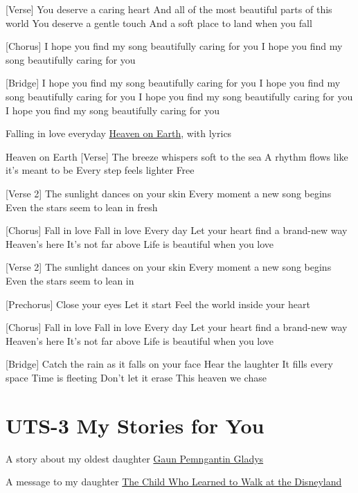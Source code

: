 \documentclass[
  letterpaper,
  DIV=11,
  numbers=noendperiod]{scrreprt}
\begin{document}
{[}Verse{]} You deserve a caring heart And all of the most beautiful
parts of this world You deserve a gentle touch And a soft place to land
when you fall

{[}Chorus{]} I hope you find my song beautifully caring for you I hope
you find my song beautifully caring for you

{[}Bridge{]} I hope you find my song beautifully caring for you I hope
you find my song beautifully caring for you I hope you find my song
beautifully caring for you I hope you find my song beautifully caring
for you

Falling in love everyday \href{./Heaven\%20on\%20Earth.mp3}{Heaven on
Earth}, with lyrics

Heaven on Earth {[}Verse{]} The breeze whispers soft to the sea A rhythm
flows like it's meant to be Every step feels lighter Free

{[}Verse 2{]} The sunlight dances on your skin Every moment a new song
begins Even the stars seem to lean in fresh

{[}Chorus{]} Fall in love Fall in love Every day Let your heart find a
brand-new way Heaven's here It's not far above Life is beautiful when
you love

{[}Verse 2{]} The sunlight dances on your skin Every moment a new song
begins Even the stars seem to lean in

{[}Prechorus{]} Close your eyes Let it start Feel the world inside your
heart

{[}Chorus{]} Fall in love Fall in love Every day Let your heart find a
brand-new way Heaven's here It's not far above Life is beautiful when
you love

{[}Bridge{]} Catch the rain as it falls on your face Hear the laughter
It fills every space Time is fleeting Don't let it erase This heaven we
chase


\chapter{UTS-3 My Stories for You}\label{uts-3-my-stories-for-you}

A story about my oldest daughter
\href{https://azrl.wordpress.com/2020/07/18/gaun-pengantin-gladys/\#comment-28004}{Gaun
Pemngantin Gladys}

A message to my daughter
\href{https://azrl.wordpress.com/2021/10/06/the-child-who-learned-to-walk-at-the-disneyland/}{The
Child Who Learned to Walk at the Disneyland}
\end{document}
